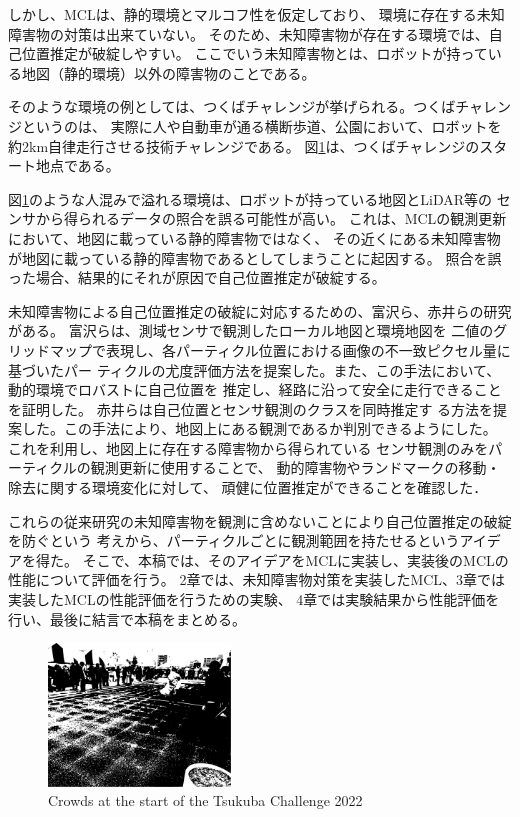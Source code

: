 \documentclass{jarticle}
\begin{document}
しかし、MCLは、静的環境とマルコフ性を仮定しており、
環境に存在する未知障害物の対策は出来ていない。
そのため、未知障害物が存在する環境では、自己位置推定が破綻しやすい。
ここでいう未知障害物とは、ロボットが持っている地図（静的環境）以外の障害物のことである。

そのような環境の例としては、つくばチャレンジ\cite{つくばチャレンジ}が挙げられる。つくばチャレンジというのは、
実際に人や自動車が通る横断歩道、公園において、ロボットを約2km自律走行させる技術チャレンジである。
図\ref{fig: つくばチャレンジ人混み}は、つくばチャレンジのスタート地点である。

図\ref{fig: つくばチャレンジ人混み}のような人混みで溢れる環境は、ロボットが持っている地図とLiDAR等の
センサから得られるデータの照合を誤る可能性が高い。
これは、MCLの観測更新において、地図に載っている静的障害物ではなく、
その近くにある未知障害物が地図に載っている静的障害物であるとしてしまうことに起因する。
照合を誤った場合、結果的にそれが原因で自己位置推定が破綻する。

未知障害物による自己位置推定の破綻に対応するための、富沢ら\cite{富沢}、赤井ら\cite{赤井}の研究がある。
富沢ら\cite{富沢}は、測域センサで観測したローカル地図と環境地図を
二値のグリッドマップで表現し、各パーティクル位置における画像の不一致ピクセル量に基づいたパー
ティクルの尤度評価方法を提案した。また、この手法において、動的環境でロバストに自己位置を
推定し、経路に沿って安全に走行できることを証明した。
赤井ら\cite{赤井}は自己位置とセンサ観測のクラスを同時推定す
る方法を提案した。この手法により、地図上にある観測であるか判別できるようにした。
これを利用し、地図上に存在する障害物から得られている
センサ観測のみをパーティクルの観測更新に使用することで、
動的障害物やランドマークの移動・除去に関する環境変化に対して、
頑健に位置推定ができることを確認した．

これらの従来研究の未知障害物を観測に含めないことにより自己位置推定の破綻を防ぐという
考えから、パーティクルごとに観測範囲を持たせるというアイデアを得た。
そこで、本稿では、そのアイデアをMCLに実装し、実装後のMCLの性能について評価を行う。
2章では、未知障害物対策を実装したMCL、3章では実装したMCLの性能評価を行うための実験、
4章では実験結果から性能評価を行い、最後に結言で本稿をまとめる。

\begin{figure}[h]
  \centering
   \includegraphics[height=38mm]{fig/hitogomi.eps}
   \vspace*{-4mm}
   \caption{Crowds at the start of the Tsukuba Challenge 2022}
   \label{fig: つくばチャレンジ人混み}
 \end{figure}
\end{document}
